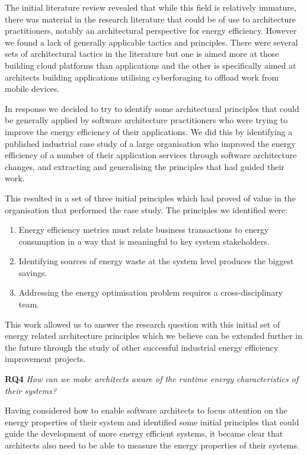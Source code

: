 The initial literature review revealed that while this field is relatively immature, there was material in the research literature that could be of use to architecture practitioners, notably an architectural perspective for energy efficiency.  However we found a lack of generally applicable tactics and principles.  There were several sets of architectural tactics in the literature \cite{lewis2015-foragingtactics,procaccianti2013-cloudenergyefficiency} but one is aimed more at those building cloud platforms than applications and the other is specifically aimed at architects building applications utilising cyberforaging to offload work from mobile devices.

In response we decided to try to identify some architectural principles that could be generally applied by software architecture practitioners who were trying to improve the energy efficiency of their applications.  We did this by identifying a published industrial case study of a large organisation who improved the energy efficiency of a number of their application services through software architecture changes, and extracting and generalising the principles that had guided their work.

This resulted in a set of three initial principles which had proved of value in the organisation that performed the case study.  The principles we identified were:
\begin{enumerate}
	\item Energy efficiency metrics must relate business transactions to energy consumption in a way that is meaningful to key system stakeholders.
	\item Identifying sources of energy waste at the system level produces the biggest savings.
	\item Addressing the energy optimisation problem requires a cross-disciplinary team.
\end{enumerate}

This work allowed us to answer the research question with this initial set of energy related architecture principles which we believe can be extended further in the future through the study of other successful industrial energy efficiency improvement projects.

\textbf{RQ4} \emph{How can we make architects aware of the runtime energy characteristics of their systems?}

Having considered how to enable software architects to focus attention on the energy properties of their system and identified some initial principles that could guide the development of more energy efficient systems, it became clear that architects also need to be able to measure the energy properties of their systems.

